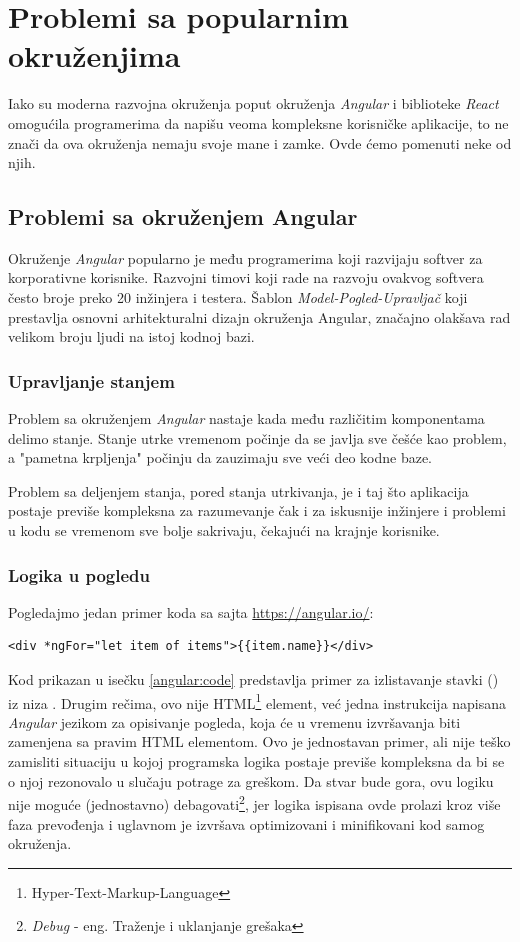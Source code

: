 \documentclass[12pt,oneside]{memoir}
\newcommand{\code}[1]{\colorbox{codegray}{\texttt{\scalebox{0.9}{#1}}}}%
\begin{document}
\chapter{Problemi sa popularnim okruženjima}
Iako su moderna razvojna okruženja poput okruženja \emph{Angular} i biblioteke \emph{React} omogućila
programerima da napišu veoma kompleksne korisničke aplikacije, to ne znači da ova okruženja
nemaju svoje mane i zamke. Ovde ćemo pomenuti neke od njih.
\section{Problemi sa okruženjem Angular}
Okruženje \emph{Angular} popularno je među programerima koji razvijaju softver za korporativne korisnike.
Razvojni timovi koji rade na razvoju ovakvog softvera često broje preko 20 inžinjera i testera.
Šablon \emph{Model-Pogled-Upravljač} koji prestavlja osnovni arhitekturalni dizajn okruženja Angular,
značajno olakšava rad velikom broju ljudi na istoj kodnoj bazi.
\subsection{Upravljanje stanjem}

Problem sa okruženjem \emph{Angular} nastaje kada među različitim komponentama delimo stanje. Stanje utrke vremenom počinje da
se javlja sve češće kao problem, a "pametna krpljenja" počinju da zauzimaju sve veći deo kodne baze.

Problem sa deljenjem stanja, pored stanja utrkivanja, je i taj što aplikacija postaje previše kompleksna
za razumevanje čak i za iskusnije inžinjere i problemi u kodu se vremenom sve bolje sakrivaju,
čekajući na krajnje korisnike.


\subsection{Logika u pogledu}
Pogledajmo jedan primer koda sa sajta \url{https://angular.io/}:
\begin{lstlisting}[style=htmlStyle, caption={Isečak Angular koda},label=angular:code]
<div *ngFor="let item of items">{{item.name}}</div>
\end{lstlisting}
Kod prikazan u isečku \ref{angular:code} predstavlja primer za izlistavanje stavki (\code{item}) iz niza \code{items}.
Drugim rečima, ovo nije HTML\footnote{Hyper-Text-Markup-Language} element, već jedna instrukcija napisana \emph{Angular} jezikom za opisivanje
pogleda, koja će u vremenu izvršavanja biti zamenjena sa pravim HTML elementom.
Ovo je jednostavan primer, ali nije teško zamisliti situaciju u kojoj programska logika postaje previše kompleksna
da bi se o njoj rezonovalo u slučaju potrage za greškom. Da stvar bude gora, ovu logiku nije moguće (jednostavno) debagovati\footnote{\emph{Debug} - eng. Traženje i uklanjanje grešaka},
jer logika ispisana ovde prolazi kroz više faza prevođenja i uglavnom je izvršava
optimizovani i minifikovani kod samog okruženja.
\end{document}
